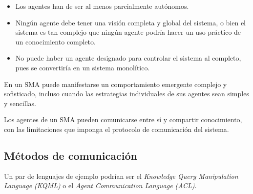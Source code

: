\begin{itemize}
 \item Los agentes han de ser al menos parcialmente autónomos.
 \item Ningún agente debe tener una visión completa y global del sistema, o
 bien el sistema es tan complejo que ningún agente podría hacer un uso práctico
 de un conocimiento completo.
 \item No puede haber un agente designado para controlar el sistema al
 completo, pues se convertiría en un sistema monolítico.
\end{itemize}

En un SMA puede manifestarse un comportamiento emergente complejo y sofisticado,
incluso cuando las estrategias individuales de sus agentes sean simples y
sencillas.

Los agentes de un SMA pueden comunicarse entre sí y compartir conocimiento, con
las limitaciones que imponga el protocolo de comunicación del sistema.


\subsection*{Métodos de comunicación}

Un par de lenguajes de ejemplo podrían ser el {\em Knowledge Query Manipulation
Language (KQML)} o el {\em Agent Communication Language (ACL)}.

